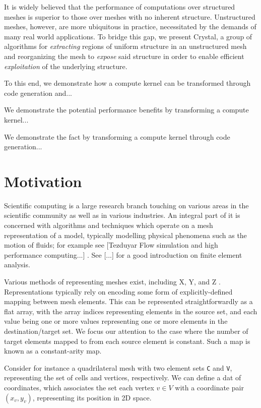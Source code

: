 It is widely believed that the performance of computations over structured meshes is superior to those over meshes with no inherent structure.
Unstructured meshes, however, are more ubiquitous in practice, necessitated by the demands of many real world applications.
To bridge this gap, we present Crystal, a group of algorithms for \emph{extracting} regions of uniform structure in an unstructured mesh and reorganizing the mesh to \emph{expose} said structure in order to enable efficient \emph{exploitation} of the underlying structure.

To this end, we demonstrate how a compute kernel can be transformed through code generation and...

We demonstrate the potential performance benefits by transforming a compute kernel...

We demonstrate the fact by transforming a compute kernel through code generation...



\section{Motivation}
Scientific computing is a large research branch touching on various areas in the scientific community as well as in various industries. An integral part of it is concerned with algorithms and techniques which operate on a mesh representation of a model, typically modelling physical phenomena such as the motion of fluids; for example see [Tezduyar Flow simulation and high performance computing...]
. See [...]
for a good introduction on finite element analysis.


Various methods of representing meshes exist, including X, Y, and Z
. Representations typically rely on encoding some form of explicitly-defined mapping between mesh elements. This can be represented straightforwardly as a flat array, with the array indices representing elements in the source set, and each value being one or more values representing one or more elements in the destination/target set. We focus our attention to the case where the number of target elements mapped to from each source element is constant. Such a map is known as a constant-arity map.

Consider for instance a quadrilateral mesh with two element sets \texttt{C} and \texttt{V}, representing the set of cells and vertices, respectively.
We can define a dat of coordinates, which associates the set each vertex $v \in V$ with a coordinate pair $(x_v, y_v)$, representing its position in 2D space.

